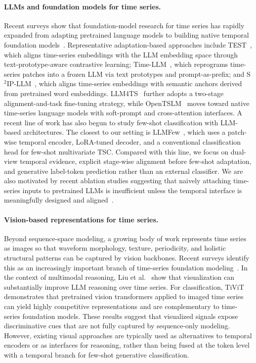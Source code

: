 \documentclass[lettersize,journal]{IEEEtran}
\begin{document}
\paragraph{LLMs and foundation models for time series.}
Recent surveys show that foundation-model research for time series has rapidly expanded from adapting pretrained language models to building native temporal foundation models~\cite{jiang2024empowering,ye2024survey,shi2025large}. Representative adaptation-based approaches include TEST~\cite{sun2023test}, which aligns time-series embeddings with the LLM embedding space through text-prototype-aware contrastive learning; Time-LLM~\cite{jin2024time}, which reprograms time-series patches into a frozen LLM via text prototypes and prompt-as-prefix; and S$^2$IP-LLM~\cite{pan2024s}, which aligns time-series embeddings with semantic anchors derived from pretrained word embeddings. LLM4TS~\cite{chang2025llm4ts} further adopts a two-stage alignment-and-task fine-tuning strategy, while OpenTSLM~\cite{langer2025opentslm} moves toward native time-series language models with soft-prompt and cross-attention interfaces. A recent line of work has also begun to study few-shot classification with LLM-based architectures. The closest to our setting is LLMFew~\cite{chen2025large}, which uses a patch-wise temporal encoder, LoRA-tuned decoder, and a conventional classification head for few-shot multivariate TSC. Compared with this line, we focus on dual-view temporal evidence, explicit stage-wise alignment before few-shot adaptation, and generative label-token prediction rather than an external classifier. We are also motivated by recent ablation studies suggesting that naively attaching time-series inputs to pretrained LLMs is insufficient unless the temporal interface is meaningfully designed and aligned~\cite{tan2024language}.

\paragraph{Vision-based representations for time series.}
Beyond sequence-space modeling, a growing body of work represents time series as images so that waveform morphology, texture, periodicity, and holistic structural patterns can be captured by vision backbones. Recent surveys identify this as an increasingly important branch of time-series foundation modeling~\cite{ni2025harnessing}. In the context of multimodal reasoning, Liu et al.~\cite{liu2025picture} show that visualization can substantially improve LLM reasoning over time series. For classification, TiViT~\cite{roschmann2025time} demonstrates that pretrained vision transformers applied to imaged time series can yield highly competitive representations and are complementary to time-series foundation models. These results suggest that visualized signals expose discriminative cues that are not fully captured by sequence-only modeling. However, existing visual approaches are typically used as alternatives to temporal encoders or as interfaces for reasoning, rather than being fused at the token level with a temporal branch for few-shot generative classification.
\end{document}
